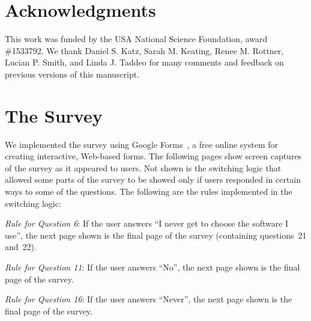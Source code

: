 \documentclass{casicswhitepaper}
\begin{document}



\section{Acknowledgments}

This work was funded by the USA National Science Foundation, award \#1533792.  We thank
Daniel S. Katz,
Sarah M. Keating,
Renee M. Rottner,
Lucian P. Smith, and
Linda J. Taddeo
for many comments and feedback on previous versions of this manuscript.


\clearpage
\appendix

\section{The Survey}
\label{apdx:survey}

We implemented the survey using Google Forms~\cite{googleforms}, a free online system for creating interactive, Web-based forms.  The following pages show screen captures of the survey as it appeared to users.  Not shown is the switching logic that allowed some parts of the survey to be showed only if users responded in certain ways to some of the questions.  The following are the rules implemented in the switching logic:
\begin{description}

\item \emph{Rule for Question 6}: If the user answers ``I never get to choose the software I use'', the next page shown is the final page of the survey (containing questions~21 and~22).

\item  \emph{Rule for Question 11}: If the user answers ``No'', the next page shown is the final page of the survey.

\item \emph{Rule for Question 16}:  If the user answers ``Never'', the next page shown is the final page of the survey.

\end{description}
\end{document}
